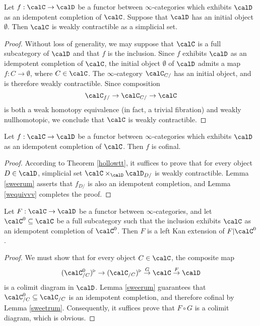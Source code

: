 \begin{lemma}\label{wequivvv}
Let $f: \calC \rightarrow \calD$ be a functor between $\infty$-categories which exhibits $\calD$ as an idempotent completion of $\calC$. Suppose that $\calD$ has an initial object $\emptyset$. Then
$\calC$ is weakly contractible as a simplicial set.
\end{lemma}

\begin{proof}
Without loss of generality, we may suppose that $\calC$ is a full subcategory of $\calD$ and that $f$ is the inclusion. Since $f$ exhibits $\calD$ as an idempotent completion of $\calC$, the initial object $\emptyset$ of $\calD$ admits a map $f: C \rightarrow \emptyset$, where $C \in \calC$.
The $\infty$-category $\calC_{C/}$ has an initial object, and
is therefore weakly contractible. Since composition
$$ \calC_{f/} \rightarrow \calC_{C/} \rightarrow \calC$$
is both a weak homotopy equivalence (in fact, a trivial fibration) and weakly nullhomotopic, we
conclude that $\calC$ is weakly contractible.
\end{proof}

\begin{lemma}\label{sweetrum}
Let $f: \calC \rightarrow \calD$ be a functor between $\infty$-categories which exhibits $\calD$ as an idempotent completion of $\calC$. Then $f$ is cofinal.
\end{lemma}

\begin{proof}
According to Theorem \ref{hollowtt}, it suffices to prove that for every object $D \in \calD$, 
simplicial set $\calC \times_{\calD} \calD_{D/}$ is weakly contractible. Lemma \ref{sweerum} asserts that $f_{D/}$ is also an idempotent completion, and Lemma \ref{wequivvv} completes the proof.
\end{proof}

\begin{lemma}\label{honeybeen}
Let $F: \calC \rightarrow \calD$ be a functor between $\infty$-categories, and let
$\calC^{0} \subseteq \calC$ be a full subcategory such that the inclusion exhibits
$\calC$ as an idempotent completion of $\calC^{0}$. Then $F$ is a left Kan extension
of $F|\calC^{0}$. 
\end{lemma}

\begin{proof}
We must show that for every object $C \in \calC$, the composite map
$$ (\calC^0_{/C})^{\triangleright} \rightarrow (\calC_{/C})^{\triangleright}
\stackrel{G}{\rightarrow} \calC \stackrel{F}{\rightarrow} \calD$$
is a colimit diagram in $\calD$. Lemma \ref{sweerum} guarantees that 
$\calC^0_{/C} \subseteq \calC_{/C}$ is an idempotent completion, and therefore cofinal by Lemma \ref{sweetrum}. Consequently, it suffices prove that $F \circ G$ is a colimit diagram, which is obvious.
\end{proof}

